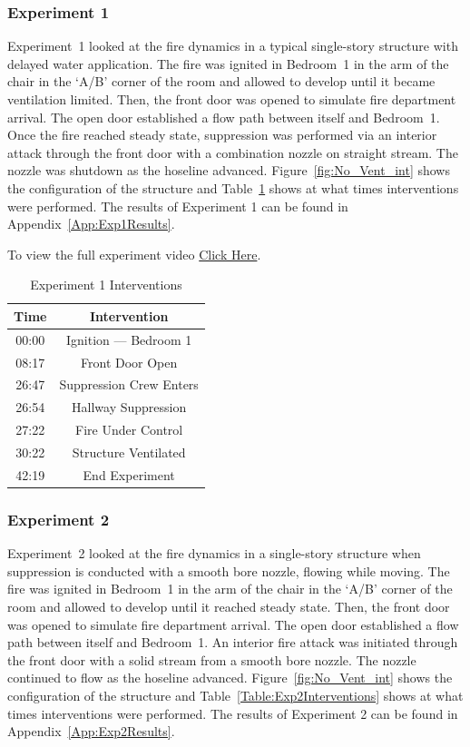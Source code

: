 \documentclass[12pt,oneside]{book}
\begin{document}
\subsubsection{Experiment 1}
Experiment~1 looked at the fire dynamics in a typical single-story structure with delayed water application. The fire was ignited in Bedroom~1 in the arm of the chair in the `A/B' corner of the room and allowed to develop until it became ventilation limited. Then, the front door was opened to simulate fire department arrival. The open door established a flow path between itself and Bedroom~1. Once the fire reached steady state, suppression was performed via an interior attack through the front door with a combination nozzle on straight stream. The nozzle was shutdown as the hoseline advanced. Figure~\ref{fig:No_Vent_int} shows the configuration of the structure and Table~\ref{Table:Exp1Interventions} shows at what times interventions were performed. The results of Experiment 1 can be found in Appendix~\ref{App:Exp1Results}. 

To view the full experiment video \href{https://player.vimeo.com/video/170499605?autoplay=1}{Click Here}.

\begin{table}[!ht]
	\centering
	\caption{Experiment 1 Interventions}
	\begin{tabular}{|c|c|} 
		\hline
		Time & Intervention \\ \hline \hline
		00:00 & Ignition --- Bedroom 1 \\ \hline
		08:17 & Front Door Open \\ \hline
		26:47 & Suppression Crew Enters\\ \hline
		26:54 & Hallway Suppression \\ \hline
		27:22 & Fire Under Control \\ \hline
		30:22 & Structure Ventilated \\ \hline
		42:19 & End Experiment\\ \hline
	\end{tabular}
	\label{Table:Exp1Interventions}
\end{table}

\FloatBarrier
\clearpage

\subsubsection{Experiment 2}

Experiment~2 looked at the fire dynamics in a single-story structure when suppression is conducted with a smooth bore nozzle, flowing while moving. The fire was ignited in Bedroom~1 in the arm of the chair in the `A/B' corner of the room and allowed to develop until it reached steady state. Then, the front door was opened to simulate fire department arrival. The open door established a flow path between itself and Bedroom~1. An interior fire attack was initiated through the front door with a solid stream from a smooth bore nozzle. The nozzle continued to flow as the hoseline advanced. Figure~\ref{fig:No_Vent_int} shows the configuration of the structure and Table~\ref{Table:Exp2Interventions} shows at what times interventions were performed. The results of Experiment 2 can be found in Appendix~\ref{App:Exp2Results}. 
\end{document}
